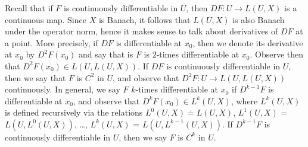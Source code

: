 \documentclass[12pt,reqno]{amsart}
\numberwithin{equation}{section}  %
\begin{document}
Recall that if $F$ is continuously differentiable in $U$, then $DF : U \to L(U,
X)$ is a continuous map. Since $X$ is Banach, it follows that $L(U, X)$ is also
Banach under the operator norm, hence it makes sense to talk about derivatives
of $DF$ at a point. More precisely, if $DF$ is differentiable at $x_{0}$, then
we denote its derivative at $x_{0}$ by $D^{2}F(x_{0})$ and say that 
is $F$ is $2$-times differentiable at $x_{0}$.
Observe then that $D^{2}F(x_{0}) \in L(U, L(U,X))$. If $DF$ is continuously
differentiable in $U$, then we say that $F$ is $C^{2}$ in $U$, and observe that
$D^{2}F : U \to L(U, L(U, X))$ continuously. In general, we say $F$ $k$-times
differentiable at $x_{0}$ if $D^{k-1}F$ is differentiable at $x_{0}$, and
observe that $D^{k}F(x_{0}) \in L^{k}(U, X)$, where $L^{k}(U, X)$ is
defined recursively via the relations $L^{0}(U, X) \doteq L(U, X)$, $L^{1}(U,
X)$ = $L(U, L^{0}(U, X))$, \ldots, $L^{k}(U, X)$ = $L(U, L^{k-1}(U, X))$.
If $D^{k-1}F$ is
continuously differentiable in $U$, then we say $F$ is $C^{k}$ in $U$. 
\end{document}
